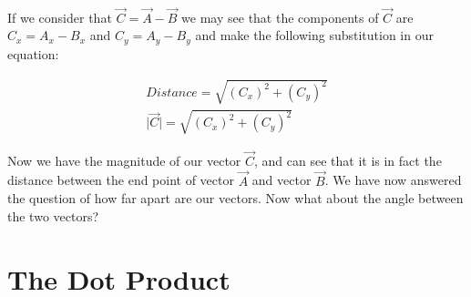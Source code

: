 \documentclass[12pt, letterpaper]{report}
\begin{document}
		\paragraph{} If we consider that $\vec{C} = \vec{A} - \vec{B}$ we may see that the components of $\vec{C}$ are $C_x = A_x - B_x$ and $C_y = A_y - B_y$ and make the following substitution in our equation:

		\begin{align*}
		Distance = \sqrt{\left(C_x\right)^2 + \left(C_y\right)^2}\\
		\lvert\vec{C}\rvert = \sqrt{\left(C_x\right)^2 + \left(C_y\right)^2}
		\end{align*}

		Now we have the magnitude of our vector $\overrightarrow{C}$, and can see that it is in fact the distance between the end point of vector $\vec{A}$ and vector $\vec{B}$. We have now answered the question of how far apart are our vectors. Now what about the angle between the two vectors?
		
		\section{The Dot Product}
\end{document}
